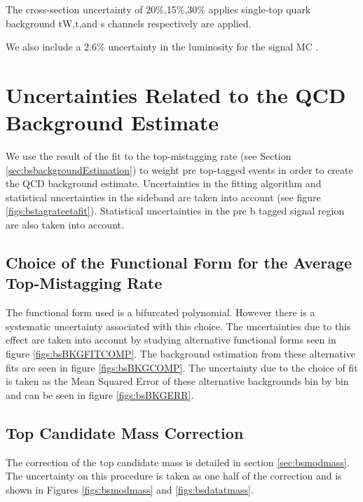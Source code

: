 The cross-section uncertainty of 20\%,15\%,30\% applies single-top quark background tW,t,and s channels respectively are applied.

We also include a 2.6\% uncertainty in the luminosity for the signal MC \cite{CMS-PAS-LUM-13-001}. 


\clearpage
\section{Uncertainties Related to the QCD Background Estimate}
We use the result of the fit to the top-mistagging rate (see Section \ref{sec:bsbackgroundEstimation}) to weight 
pre top-tagged events in order to create the QCD background estimate.  Uncertainties in
the fitting algorithm and statistical uncertainties in the sideband
are taken into account (see figure \ref{figs:bstagrateetafit}).
Statistical uncertainties in the pre b tagged signal region are also
taken into account.

\subsection{Choice of the Functional Form for the Average Top-Mistagging Rate}
\label{sec:bschoiceoffit}
The functional form used is a bifurcated polynomial.
However there is a systematic uncertainty associated with this choice.
The uncertainties due to this effect are taken into account by
studying alternative functional forms seen in figure
\ref{figs:bsBKGFITCOMP}.  The background estimation from these
alternative fits are seen in figure \ref{figs:bsBKGCOMP}.  The
uncertainty due to the choice of fit is taken as the Mean Squared
Error of these alternative backgrounds bin by bin and can be seen in
figure \ref{figs:bsBKGERR}.  

\subsection{Top Candidate Mass Correction}
\label{sec:bsmascorrerror}
The correction of the top candidate mass is detailed in section \ref{sec:bsmodmass}.  The uncertainty on this procedure is taken as one half of the correction 
and is shown in Figures \ref{figs:bsmodmass} and \ref{figs:bsdatatmass}.   


